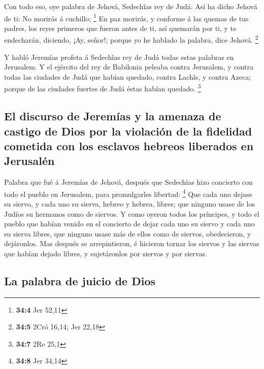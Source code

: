 Con todo eso, oye palabra de Jehová, Sedechîas rey de
Judá: Así ha dicho Jehová de ti: No morirás á cuchillo; \footnote{\textbf{34:4}
  Jer 52,11}  En paz morirás, y conforme á las quemas de
tus padres, los reyes primeros que fueron antes de ti, así quemarán por
ti, y te endecharán, diciendo, ¡Ay, señor!; porque yo he hablado la
palabra, dice Jehová. \footnote{\textbf{34:5} 2Cró 16,14; Jer 22,18}

 Y habló Jeremías profeta á Sedechîas rey de Judá todas
estas palabras en Jerusalem.  Y el ejército del rey de
Babilonia peleaba contra Jerusalem, y contra todas las ciudades de Judá
que habían quedado, contra Lachîs, y contra Azeca; porque de las
ciudades fuertes de Judá éstas habían quedado. \footnote{\textbf{34:7}
  2Re 25,1}

\hypertarget{el-discurso-de-jeremuxedas-y-la-amenaza-de-castigo-de-dios-por-la-violaciuxf3n-de-la-fidelidad-cometida-con-los-esclavos-hebreos-liberados-en-jerusaluxe9n}{%
\subsection{El discurso de Jeremías y la amenaza de castigo de Dios por
la violación de la fidelidad cometida con los esclavos hebreos liberados
en
Jerusalén}\label{el-discurso-de-jeremuxedas-y-la-amenaza-de-castigo-de-dios-por-la-violaciuxf3n-de-la-fidelidad-cometida-con-los-esclavos-hebreos-liberados-en-jerusaluxe9n}}

 Palabra que fué á Jeremías de Jehová, después que
Sedechîas hizo concierto con todo el pueblo en Jerusalem, para
promulgarles libertad: \footnote{\textbf{34:8} Jer 34,14} 
Que cada uno dejase su siervo, y cada uno su sierva, hebreo y hebrea,
libres; que ninguno usase de los Judíos su hermanos como de siervos.
 Y como oyeron todos los príncipes, y todo el pueblo que
habían venido en el concierto de dejar cada uno su siervo y cada uno su
sierva libres, que ninguno usase más de ellos como de siervos,
obedecieron, y dejáronlos.  Mas después se arrepintieron,
é hicieron tornar los siervos y las siervas que habían dejado libres, y
sujetáronlos por siervos y por siervas.

\hypertarget{la-palabra-de-juicio-de-dios}{%
\subsection{La palabra de juicio de
Dios}\label{la-palabra-de-juicio-de-dios}}

